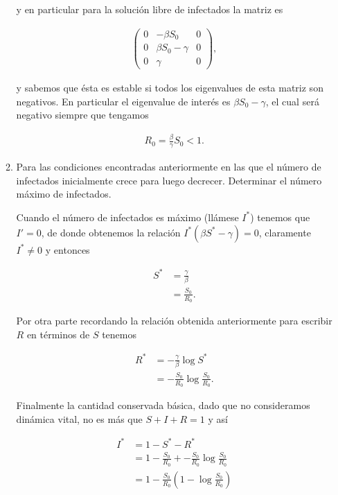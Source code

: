 \documentclass[answers]{exam}
\begin{document}
\begin{questions}
\begin{enumerate}
\begin{enumerate}
\begin{solution}
y en particular para la solución libre de infectados la matriz es

\begin{align*}
    \begin{pmatrix}
                    0 & -\beta S_0 & 0\\
                    0 & \beta S_0 - \gamma & 0\\
                    0 & \gamma & 0
                \end{pmatrix},
\end{align*}

y sabemos que ésta es estable si todos los eigenvalues de esta matriz son negativos. En particular el eigenvalue de interés es $\beta S_0 - \gamma$, el cual será negativo siempre que tengamos

\begin{align*}
    R_0 = \frac{\beta}{\gamma}S_0 < 1.
\end{align*}
\end{solution}

\item Para las condiciones encontradas anteriormente en las que el n\'umero de infectados inicialmente crece para luego decrecer. Determinar el n\'umero m\'aximo de infectados. 

\begin{solution}
Cuando el número de infectados es máximo (llámese $I^*$) tenemos que $I' = 0$, de donde obtenemos la relación $I^*(\beta S^* - \gamma) = 0$, claramente $I^* \neq 0$ y entonces

\begin{align*}
    S^* &= \frac{\gamma}{\beta}\\
    &= \frac{S_0}{R_0}.
\end{align*}

Por otra parte recordando la relación obtenida anteriormente para escribir $R$ en términos de $S$ tenemos

\begin{align*}
    R^* &= -\frac{\gamma}{\beta}\log{S^*}\\
    &= -\frac{S_0}{R_0}\log{\frac{S_0}{R_0}}.
\end{align*}

Finalmente la cantidad conservada básica, dado que no consideramos dinámica vital, no es más que $S + I + R = 1$ y así

\begin{align*}
    I^* &= 1 - S^* - R^*\\
    &= 1 - \frac{S_0}{R_0} + -\frac{S_0}{R_0}\log{\frac{S_0}{R_0}}\\
    &= 1 - \frac{S_0}{R_0}(1 - \log{\frac{S_0}{R_0}})
\end{align*}
\end{solution}


\end{enumerate}
\end{enumerate}
\end{questions}
\end{document}
